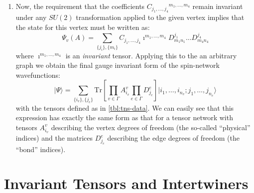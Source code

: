 \documentclass[preprint]{SciPost}
\newcommand{\ket}[1]{\vert #1 \rangle}
\newcommand{\Tr}{\mathrm{Tr}}
\theoremstyle{plain} %
\begin{document}
\begin{enumerate}[label=\arabic*.]
		\begin{equation}\label{eqn:edge-wigner-matrix}
			D^{j_e}_{mn} \equiv D^{j_e}_{m_v n_{v'}}
		\end{equation}
		where the first matrix index $ m $ is associated with the source vertex $ v $ and the second index $ n $ is associated with the target vertex $ n $. Using this notation we can write the state associated with a \emph{single} node $ v $ joined to four edges as:
		\begin{equation}\label{eqn:4-valent-node-v1}
			\Psi_v(A) = \underset{\{j_i\},\{m_i\}}{\sum} C_{j_1,\ldots,j_{4}}{}^{m_1,\ldots,m_{4}} D^{j_1}_{m_1 n_1} \ldots D^{j_{4}}_{m_{4} n_{4}}
		\end{equation}
		where the indices $ m_1, m_2, m_3, m_4 $ are those ends of the edges which meet the vertex and $ n_1, n_2, n_3, n_4 $ are for the ``free'' ends.
		\item Now, the requirement that the coefficients $ C_{j_1,\ldots,j_{4}}{}^{m_1,\ldots,m_{4}} $ remain invariant under any $ SU(2) $ transformation applied to the given vertex implies that the state for this vertex must be written as:
		\begin{equation}\label{eqn:4-valent-node-v2}
			\Psi_v(A) = \underset{\{j_i\},\{m_i\}}{\sum} C_{j_1,\ldots,j_{4}} \imath^{m_1,\ldots,m_4} D^{j_1}_{m_1 n_1} \ldots D^{j_{4}}_{m_{4} n_{4}}
		\end{equation}
		where $ \imath^{m_1,\ldots,m_4} $ is an \emph{invariant} tensor. Applying this to the an arbitrary graph we obtain the final gauge invariant form of the spin-network wavefunctions:
		\begin{equation}\label{eqn:gauge-invariant-state}
			\ket{\Psi} = \underset{\{i_v\}, \{ j_e \}}{\sum} \Tr\left[ \underset{v \in \Gamma}\prod A^v_{i_v} \underset{e \in \Gamma}\prod D^e_{j_e} \right] \ket{i_1,\ldots,i_{n_v}; j_1, \ldots, j_{n_e} } 
		\end{equation}
		with the tensors defined as in \autoref{tbl:tns-data}. We can easily see that this expression has exactly the same form as that for a tensor network with tensors $ A^v_{i_v} $ describing the vertex degrees of freedom (the so-called ``physical'' indices) and the matrices $ D^e_{j_e} $ describing the edge degrees of freedom (the ``bond'' indices).
	\end{enumerate}


\section{Invariant Tensors and Intertwiners}\label{sec:invariant-tensors}
\end{document}
